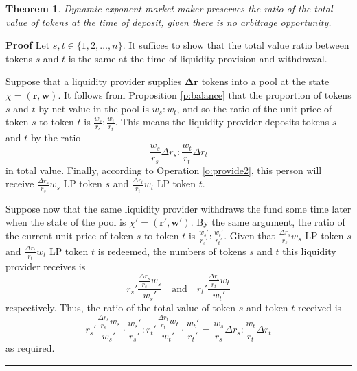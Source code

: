 \documentclass[12pt,a4paper]{article}
\newtheorem{theorem}[corollary]{Theorem}
\newcommand{\qed}{\rule{.07in}{.1in}}
\newenvironment{proof}{\vspace{1ex}\noindent\textbf{Proof}\hspace{0.5em}}{\hfill\qed\vspace{1ex}}
\begin{document}

\begin{theorem}
Dynamic exponent market maker preserves the ratio of the total value of tokens at the time of deposit, given there is no arbitrage opportunity.
\end{theorem}

\begin{proof}
Let $s,t\in\{1,2,\ldots,n\}$. It suffices to show that the total value ratio between tokens $s$ and $t$ is the same at the time of liquidity provision and withdrawal.

Suppose that a liquidity provider supplies $\mathbf{\Delta r}$ tokens into a pool at the state $\chi=(\mathbf{r},\mathbf{w})$. It follows from Proposition \ref{p:balance} that the proportion of tokens $s$ and $t$ by net value in the pool is $w_s:w_t$, and so the ratio of the unit price of token $s$ to token $t$ is $\frac{w_s}{r_s}:\frac{w_t}{r_t}$. This means the liquidity provider deposits tokens $s$ and $t$ by the ratio
\[\frac{w_s}{r_s}\Delta r_s:\frac{w_t}{r_t}\Delta r_t\]
in total value. Finally, according to Operation \ref{o:provide2}, this person will receive $\frac{\Delta r_s}{r_s}w_s$ LP token $s$ and $\frac{\Delta r_t}{r_t}w_t$ LP token $t$.

Suppose now that the same liquidity provider withdraws the fund some time later when the state of the pool is $\chi'=(\mathbf{r'},\mathbf{w'})$. By the same argument, the ratio of the current unit price of token $s$ to token $t$ is $\frac{w_s'}{r_s'}:\frac{w_t'}{r_t'}$. Given that $\frac{\Delta r_s}{r_s}w_s$ LP token $s$ and $\frac{\Delta r_t}{r_t}w_t$ LP token $t$ is redeemed, the numbers of tokens $s$ and $t$ this liquidity provider receives is
\[r_s'\frac{\frac{\Delta r_s}{r_s}w_s}{w_s'}\quad\textrm{and}\quad r_t'\frac{\frac{\Delta r_t}{r_t}w_t}{w_t'}\]
respectively. Thus, the ratio of the total value of token $s$ and token $t$ received is
\[r_s'\frac{\frac{\Delta r_s}{r_s}w_s}{w_s'}\cdot\frac{w_s'}{r_s'}:r_t'\frac{\frac{\Delta r_t}{r_t}w_t}{w_t'}\cdot\frac{w_t'}{r_t'}=\frac{w_s}{r_s}\Delta r_s:\frac{w_t}{r_t}\Delta r_t\]
as required.
\end{proof}
\end{document}
